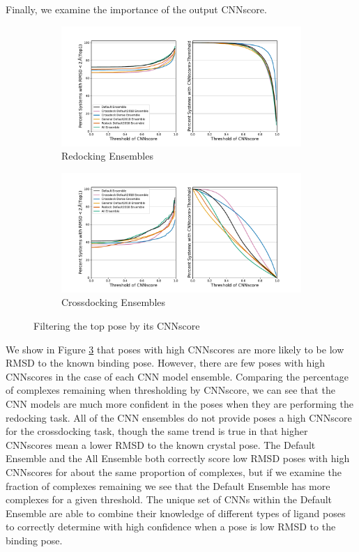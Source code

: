 \documentclass[journal=jcisd8,manuscript=article]{achemso}
\begin{document}
Finally, we examine the importance of the output CNNscore. 
\begin{figure}    
        \begin{subfigure}[b]{0.48\textwidth}    
		\centering
		\includegraphics[width=\textwidth]{figures/redocking/thresh_cnnscore_ensembles.pdf}
		\caption{Redocking Ensembles}
		\label{fig:ThreshEnsRD}
        \end{subfigure}    
        \begin{subfigure}[b]{0.48\textwidth}    
		\centering
		\includegraphics[width=\textwidth]{figures/crossdocking/thresh_cnnscore_ensembles.pdf}
		\caption{Crossdocking Ensembles}
                \label{fig:ThreshEnsCD}
        \end{subfigure}
	\caption{Filtering the top pose by its CNNscore}
	\label{fig:ScoreThresh}
\end{figure} 

We show in Figure \ref{fig:ScoreThresh} that poses with high CNNscores are more likely to be low RMSD to the known binding pose. However, there are few poses with high CNNscores in the case of each CNN model ensemble. Comparing the percentage of complexes remaining when thresholding by CNNscore, we can see that the CNN models are much more confident in the poses when they are performing the redocking task. All of the CNN ensembles do not provide poses a high CNNscore for the crossdocking task, though the same trend is true in that higher CNNscores mean a lower RMSD to the known crystal pose. The Default Ensemble and the All Ensemble both correctly score low RMSD poses with high CNNscores for about the same proportion of complexes, but if we examine the fraction of complexes remaining we see that the Default Ensemble has more complexes for a given threshold. The unique set of CNNs within the Default Ensemble are able to combine their knowledge of different types of ligand poses to correctly determine with high confidence when a pose is low RMSD to the binding pose.
\end{document}
